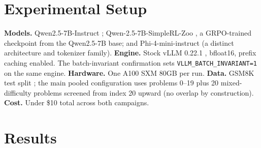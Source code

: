 \documentclass[11pt]{article}
\begin{document}
\section{Experimental Setup}

\textbf{Models.} Qwen2.5-7B-Instruct \citep{qwen2025};
Qwen-2.5-7B-SimpleRL-Zoo \citep{zeng2025simplerlzoo}, a GRPO-trained
checkpoint from the Qwen2.5-7B base; and Phi-4-mini-instruct
\citep{microsoft2025phi} (a distinct
architecture and tokenizer family). \textbf{Engine.} Stock vLLM 0.22.1
\citep{kwon2023vllm}, bfloat16, prefix caching enabled. The batch-invariant
confirmation sets \texttt{VLLM\_BATCH\_INVARIANT=1} on the same engine.
\textbf{Hardware.} One A100 SXM 80GB per run. \textbf{Data.} GSM8K test
split \citep{cobbe2021gsm8k}; the main pooled configuration uses problems
0--19 plus 20 mixed-difficulty problems screened from index 20 upward (no
overlap by construction). \textbf{Cost.} Under \$10 total across both
campaigns.

\section{Results}
\label{sec:results}
\end{document}

